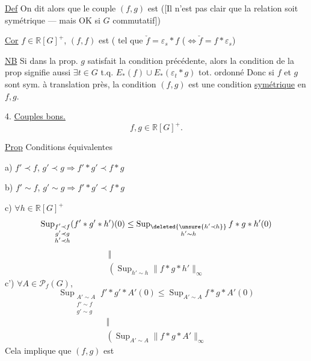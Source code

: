\uline{Def} On dit alors que le couple $(f,g)$ est \uline{}
([Il n'est pas clair que la relation soit symétrique ---  mais OK si $G$ commutatif])

\uline{Cor} $f\in\mathbb R[G]^+$,  $(f,f)$ est  (  tel que $\check f=\varepsilon_s\ast f$ ($\Longleftrightarrow\check f=f\ast\varepsilon_s$)

\uline{NB} Si dans la prop. $g$ satisfait la condition précédente, alors la condition de la prop signifie aussi  $\exists t\in G$ t.q. $E_\ast(f)\cup E_\ast(\varepsilon_t\ast g)$ tot. ordonné
Donc si $f$ et $g$ sont sym. à translation près, la condition $(f,g)$  est une condition \uline{symétrique} en $f,g$.

4. \uline{Couples bons.}
\[
f,g\in\mathbb R[G]^+.
\]

\uline{Prop} Conditions équivalentes

a) $f'\prec f$, $g'\prec g\Longrightarrow f'\ast g'\prec f\ast g$

b) $f'\sim f$, $g'\sim g\Longrightarrow f'\ast g'\prec f\ast g$

c) $\forall h\in\mathbb R[G]^+$
\[
\operatorname{Sup}_{\substack{f'\prec f\\g'\prec g\\h'\prec h}}
(f'\ast g'\ast h')(0)
\leq\operatorname{Sup}_{\substack{\deleted{\unsure{h'\prec h}}\\h'\sim h}}f\ast g\ast h'(0)
\]
\[
\begin{gathered}\Vert\\\left(\operatorname{Sup}_{h'\sim h}\|f\ast g\ast h'\|_\infty\right.\end{gathered}
\]
c') $\forall A\in\mathcal P_f(G)$,
\[
\operatorname{Sup}_{\substack{A'\sim A\\f'\sim f\\g'\sim g}}f'\ast g'\ast A'(0)
\leq\operatorname{Sup}_{A'\sim A}f\ast g\ast A'(0)
\]
\[
\begin{gathered}\Vert\\\left(\operatorname{Sup}_{A'\sim A}\|f\ast g\ast A'\|_\infty\right.\end{gathered}
\]
Cela implique que $(f,g)$ est \uline{}

